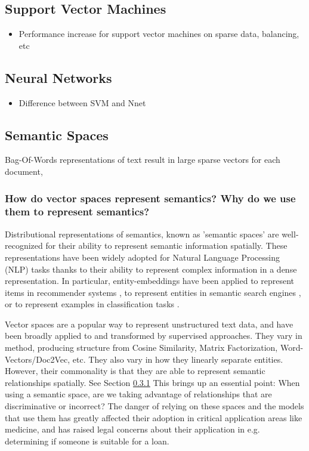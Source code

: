\subsection{Support Vector Machines}
\begin{itemize}
	\item Performance increase for support vector machines on sparse data, balancing, etc
\end{itemize}
\subsection{Neural Networks}
\begin{itemize}
	\item Difference between SVM and Nnet
\end{itemize}
\subsection{Semantic Spaces}\label{bg:SemanticSpaces}
Bag-Of-Words representations of text result in large sparse vectors for each document, 


\subsubsection{How do vector spaces represent semantics? Why do we use them to represent semantics?}\label{background:WhySpace}
Distributional representations of semantics, known as 'semantic spaces' are well-recognized for their ability to represent semantic information spatially. These representations have been widely adopted for Natural Language Processing (NLP) tasks %
thanks to their ability to represent complex information in a dense representation. In particular, entity-embeddings have been applied  to represent items in recommender systems \cite{Vasile:2016:MPE:2959100.2959160,liang2016factorization,van2016learning}, to represent entities in semantic search engines \cite{DBLP:conf/sigir/JameelBS17,van2017structural}, or to represent examples in classification tasks \cite{DBLP:conf/iccv/DemirelCI17}. %

Vector spaces are a popular way to represent unstructured text data, and have been broadly applied to and transformed by supervised approaches. They vary in method, producing structure from Cosine Similarity, Matrix Factorization, Word-Vectors/Doc2Vec, etc. %
They also vary in how they linearly separate entities. %
However, their commonality is that they are able to represent semantic relationships spatially. %
See Section \ref{background:WhySpace}
This brings up an essential point: When using a semantic space, are we taking advantage of relationships that are discriminative or incorrect? The danger of relying on these spaces and the models that use them has greatly affected their adoption in critical application areas like medicine, %
and has raised legal concerns about their application in e.g. determining if someone is suitable for a loan. 


